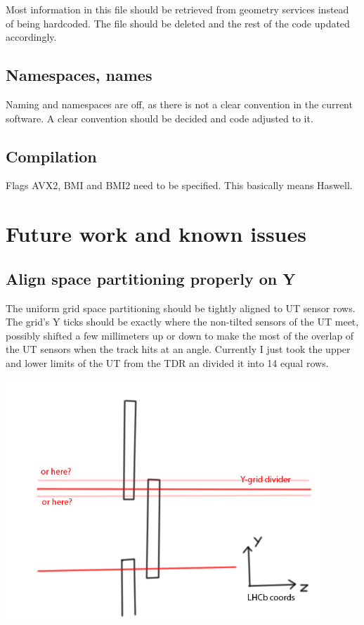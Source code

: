 \documentclass[12pt]{article}
\begin{document}
Most information in this file should be retrieved from geometry services instead of being hardcoded. The file should be deleted and the rest of the code updated accordingly.

\subsection{Namespaces, names}

Naming and namespaces are off, as there is not a clear convention in the current software. A clear convention should be decided and code adjusted to it.

\subsection{Compilation}

Flags AVX2, BMI and BMI2 need to be specified. This basically means Haswell.



\newpage
\section{Future work and known issues}

\subsection{Align space partitioning properly on Y}

The uniform grid space partitioning should be tightly aligned to UT sensor rows. The grid's Y ticks should be exactly where the non-tilted sensors of the UT meet, possibly shifted a few millimeters up or down to make the most of the overlap of the UT sensors when the track hits at an angle. Currently I just took the upper and lower limits of the UT from the TDR an divided it into 14 equal rows.

\includegraphics[width=0.9\textwidth]{images/y_grid_align.jpg}
\end{document}

